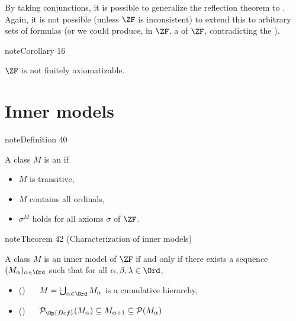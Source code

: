 \documentclass[letterpaper,10pt,english]{jupyterBook}
\begin{document}
\sphinxAtStartPar
By taking conjunctions, it is possible to generalize the reflection theorem to . Again, it is not possible (unless \(\ZF\) is inconsistent) to extend this to arbitrary sets of formulas (or we could produce, in \(\ZF\), a  of \(\ZF\), contradicting the ).
\label{constructible:cor-ZF-axiomatizable}
\begin{sphinxadmonition}{note}{Corollary 16}



\sphinxAtStartPar
\(\ZF\) is not finitely axiomatizable.
\end{sphinxadmonition}


\section{Inner models}
\label{\detokenize{constructible:inner-models}}\label{constructible:def-inner-model}
\begin{sphinxadmonition}{note}{Definition 40}



\sphinxAtStartPar
A class \(M\) is an  if
\begin{itemize}
\item {} 
\sphinxAtStartPar
\(M\) is transitive,

\item {} 
\sphinxAtStartPar
\(M\) contains all ordinals,

\item {} 
\sphinxAtStartPar
\(\sigma^M\) holds for all axioms \(\sigma\) of \(\ZF\).

\end{itemize}
\end{sphinxadmonition}
\label{constructible:thm-inner-models}
\begin{sphinxadmonition}{note}{Theorem 42 (Characterization of inner models)}



\sphinxAtStartPar
A class \(M\) is an inner model of \(\ZF\) if and only if there exists a sequence \((M_\alpha)_{\alpha \in \Ord}\) such that for all \(\alpha, \beta, \lambda \in \Ord\),
\begin{itemize}
\item {} 
\sphinxAtStartPar
() \(\quad\) \(M = \bigcup_{\alpha \in \Ord} M_\alpha\) is a cumulative hierarchy,

\item {} 
\sphinxAtStartPar
() \(\quad\) \(\mathcal{P}_{\Op{Def}}(M_\alpha) \subseteq M_{\alpha+1} \subseteq \mathcal{P}(M_\alpha)\)

\end{itemize}
\end{sphinxadmonition}
\end{document}
